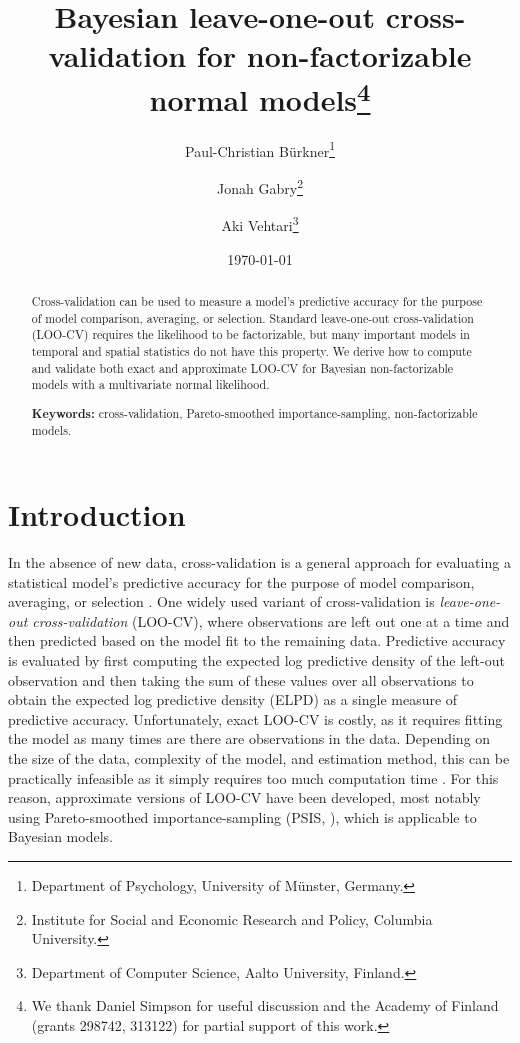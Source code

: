 \documentclass[11pt]{article}
\title{\bf Bayesian leave-one-out cross-validation for non-factorizable normal models\footnote{
We thank Daniel Simpson for useful discussion and the Academy of Finland
(grants 298742, 313122) for partial support of this work.
}\vspace{.1in}}
\author{Paul-Christian B\"{u}rkner\footnote{Department of Psychology, University of M\"{u}nster, Germany.}
  \and Jonah Gabry\footnote{Institute for Social and Economic Research and Policy, Columbia University.}
  \and Aki Vehtari\footnote{Department of Computer Science, Aalto University, Finland.
}\vspace{.1in}}
\date{\today \vspace{-.1in}}
\begin{document}
\sloppy
\maketitle
\thispagestyle{empty}

\begin{abstract}
Cross-validation can be used to measure a model's predictive accuracy for the
purpose  of model comparison, averaging, or selection. Standard leave-one-out
cross-validation  (LOO-CV) requires the likelihood to be factorizable, but many
important models in temporal  and spatial statistics do not have this property.
We derive how to compute and validate  both exact and approximate LOO-CV for
Bayesian non-factorizable models with a multivariate  normal likelihood.

\textbf{Keywords:} cross-validation, Pareto-smoothed importance-sampling,
  non-factorizable models.
\end{abstract}


\section{Introduction}

In the absence of new data, cross-validation is a general approach for evaluating
a statistical model's predictive accuracy for the purpose of model comparison, 
averaging, or selection \citep{geisser1979, vehtari2002, ando2010, vehtari2012}.
One widely used variant of
cross-validation is \emph{leave-one-out cross-validation} (LOO-CV), where
observations are left out one at a time and then predicted based on the model
fit to the remaining data. Predictive accuracy is evaluated by first computing
the expected log predictive density of the left-out observation and then taking
the sum of these values over all observations to obtain the expected log
predictive density (ELPD) as a single measure of predictive accuracy.
Unfortunately, exact LOO-CV is costly, as it requires fitting the model as many
times are there are observations in the data. Depending on the size of the data,
complexity of the model, and estimation method, this can be practically
infeasible as it simply requires too much computation time
\citep{vehtari2017loo}. For this reason, approximate versions of LOO-CV have
been developed, most notably using Pareto-smoothed importance-sampling (PSIS,
\cite{vehtari2017loo, vehtari2017psis}), which is applicable to Bayesian models.
\end{document}
